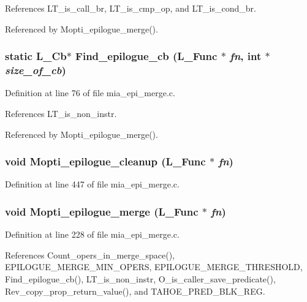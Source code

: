 References LT\_\-is\_\-call\_\-br, LT\_\-is\_\-cmp\_\-op, and LT\_\-is\_\-cond\_\-br.

Referenced by Mopti\_\-epilogue\_\-merge().
\subsubsection{\setlength{\rightskip}{0pt plus 5cm}static L\_\-Cb$\ast$ Find\_\-epilogue\_\-cb (L\_\-Func $\ast$ {\em fn}, int $\ast$ {\em size\_\-of\_\-cb})\hspace{0.3cm}{\tt  [static]}}\label{mia__epi__merge_8c_d01b9d16cd567b06a9cdaf9c111d3ec8}




Definition at line 76 of file mia\_\-epi\_\-merge.c.

References LT\_\-is\_\-non\_\-instr.

Referenced by Mopti\_\-epilogue\_\-merge().
\subsubsection{\setlength{\rightskip}{0pt plus 5cm}void Mopti\_\-epilogue\_\-cleanup (L\_\-Func $\ast$ {\em fn})}\label{mia__epi__merge_8c_b609816a640af52484e7da61b0140c69}




Definition at line 447 of file mia\_\-epi\_\-merge.c.
\subsubsection{\setlength{\rightskip}{0pt plus 5cm}void Mopti\_\-epilogue\_\-merge (L\_\-Func $\ast$ {\em fn})}\label{mia__epi__merge_8c_9bd4d0715f1c8006f178d8d2e1664cbc}




Definition at line 228 of file mia\_\-epi\_\-merge.c.

References Count\_\-opers\_\-in\_\-merge\_\-space(), EPILOGUE\_\-MERGE\_\-MIN\_\-OPERS, EPILOGUE\_\-MERGE\_\-THRESHOLD, Find\_\-epilogue\_\-cb(), LT\_\-is\_\-non\_\-instr, O\_\-is\_\-caller\_\-save\_\-predicate(), Rev\_\-copy\_\-prop\_\-return\_\-value(), and TAHOE\_\-PRED\_\-BLK\_\-REG.
